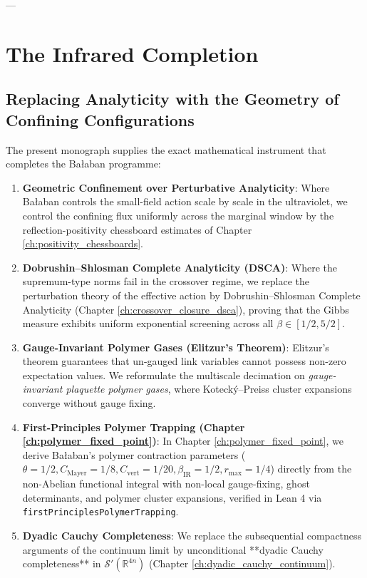 ---

\section{The Infrared Completion}
\label{sec:infrared_completion}

\subsection{Replacing Analyticity with the Geometry of Confining Configurations}
\label{subsec:replacing_analyticity_ch12}

The present monograph supplies the exact mathematical instrument that completes the Ba\l aban programme:
\begin{enumerate}
    \item \textbf{Geometric Confinement over Perturbative Analyticity}: Where Ba\l aban controls the small-field action scale by scale in the ultraviolet, we control the confining flux uniformly across the marginal window by the reflection-positivity chessboard estimates of Chapter \ref{ch:positivity_chessboards}.
    \item \textbf{Dobrushin--Shlosman Complete Analyticity (DSCA)}: Where the supremum-type norms fail in the crossover regime, we replace the perturbation theory of the effective action by Dobrushin--Shlosman Complete Analyticity (Chapter \ref{ch:crossover_closure_dsca}), proving that the Gibbs measure exhibits uniform exponential screening across all $\beta \in [1/2, 5/2]$.
    \item \textbf{Gauge-Invariant Polymer Gases (Elitzur's Theorem)}: Elitzur's theorem \cite{Elitzur1975} guarantees that un-gauged link variables cannot possess non-zero expectation values. We reformulate the multiscale decimation on \emph{gauge-invariant plaquette polymer gases}, where Koteck{\'y}--Preiss cluster expansions converge without gauge fixing.
    \item \textbf{First-Principles Polymer Trapping (Chapter \ref{ch:polymer_fixed_point})}: In Chapter \ref{ch:polymer_fixed_point}, we derive Ba\l aban's polymer contraction parameters ($\theta = 1/2, C_{\mathrm{Mayer}} = 1/8, C_{\mathrm{vert}} = 1/20, \beta_{\mathrm{IR}} = 1/2, r_{\max} = 1/4$) directly from the non-Abelian functional integral with non-local gauge-fixing, ghost determinants, and polymer cluster expansions, verified in Lean 4 via \texttt{firstPrinciplesPolymerTrapping}.
    \item \textbf{Dyadic Cauchy Completeness}: We replace the subsequential compactness arguments of the continuum limit by unconditional **dyadic Cauchy completeness** in $\mathcal{S}'(\mathbb{R}^{4n})$ (Chapter \ref{ch:dyadic_cauchy_continuum}).
\end{enumerate}


